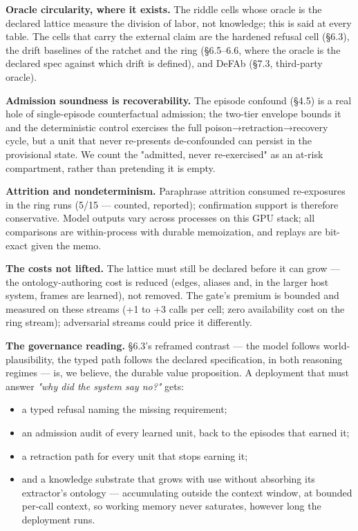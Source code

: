 \documentclass[11pt]{article}
\begin{document}
\textbf{Oracle circularity, where it exists.} The riddle cells whose oracle is the declared lattice measure the division of labor, not knowledge; this is said at every table. The cells that carry the external claim are the hardened refusal cell (§6.3), the drift baselines of the ratchet and the ring (§6.5–6.6, where the oracle is the declared spec against which drift is defined), and DeFAb (§7.3, third-party oracle).

\textbf{Admission soundness is recoverability.} The episode confound (§4.5) is a real hole of single-episode counterfactual admission; the two-tier envelope bounds it and the deterministic control exercises the full poison→retraction→recovery cycle, but a unit that never re-presents de-confounded can persist in the provisional state. We count the "admitted, never re-exercised" as an at-risk compartment, rather than pretending it is empty.

\textbf{Attrition and nondeterminism.} Paraphrase attrition consumed re-exposures in the ring runs (5/15 — counted, reported); confirmation support is therefore conservative. Model outputs vary across processes on this GPU stack; all comparisons are within-process with durable memoization, and replays are bit-exact given the memo.

\textbf{The costs not lifted.} The lattice must still be declared before it can grow — the ontology-authoring cost is reduced (edges, aliases and, in the larger host system, frames are learned), not removed. The gate's premium is bounded and measured on these streams (+1 to +3 calls per cell; zero availability cost on the ring stream); adversarial streams could price it differently.

\textbf{The governance reading.} §6.3's reframed contrast — the model follows world-plausibility, the typed path follows the declared specification, in both reasoning regimes — is, we believe, the durable value proposition. A deployment that must answer \emph{"why did the system say no?"} gets:

\begin{itemize}
\item a typed refusal naming the missing requirement;
\item an admission audit of every learned unit, back to the episodes that earned it;
\item a retraction path for every unit that stops earning it;
\item and a knowledge substrate that grows with use without absorbing its extractor's ontology — accumulating outside the context window, at bounded per-call context, so working memory never saturates, however long the deployment runs.
\end{itemize}
\end{document}
